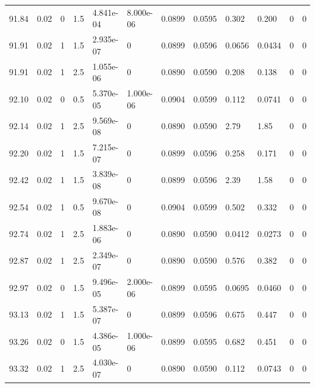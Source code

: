 \documentclass[preview]{standalone}
\begin{document}
{{{{{{{{{{{{{{{{{{\begin{tabular}{L{1.2cm}C{1.2cm} C{0.3cm}C{0.5cm} C{1.4cm}C{1.4cm} C{1.4cm}C{1.4cm} C{1.6cm}C{1.6cm} C{1.6cm}C{1.6cm}}
  91.84  &  0.02  & 0     & 1.5 &  4.841e-04  & 8.000e-06  &  0.0899&   0.0595& 0.302 & 0.200   &  0 & 0  \\ 
  91.91  &  0.02  & 1     & 1.5 &  2.935e-07  & 0  &  0.0899&   0.0596& 0.0656 & 0.0434   &  0 & 0  \\ 
  91.91  &  0.02  & 1     & 2.5 &  1.055e-06  & 0  &  0.0890&   0.0590& 0.208 & 0.138   &  0 & 0  \\ 
  92.10  &  0.02  & 0     & 0.5 &  5.370e-05  & 1.000e-06  &  0.0904&   0.0599& 0.112 & 0.0741   &  0 & 0  \\ 
  92.14  &  0.02  & 1     & 2.5 &  9.569e-08  & 0  &  0.0890&   0.0590& 2.79 & 1.85   &  0 & 0  \\ 
  92.20  &  0.02  & 1     & 1.5 &  7.215e-07  & 0  &  0.0899&   0.0596& 0.258 & 0.171   &  0 & 0  \\ 
  92.42  &  0.02  & 1     & 1.5 &  3.839e-08  & 0  &  0.0899&   0.0596& 2.39 & 1.58   &  0 & 0  \\ 
  92.54  &  0.02  & 1     & 0.5 &  9.670e-08  & 0  &  0.0904&   0.0599& 0.502 & 0.332   &  0 & 0  \\ 
  92.74  &  0.02  & 1     & 2.5 &  1.883e-06  & 0  &  0.0890&   0.0590& 0.0412 & 0.0273   &  0 & 0  \\ 
  92.87  &  0.02  & 1     & 2.5 &  2.349e-07  & 0  &  0.0890&   0.0590& 0.576 & 0.382   &  0 & 0  \\ 
  92.97  &  0.02  & 0     & 1.5 &  9.496e-05  & 2.000e-06  &  0.0899&   0.0595& 0.0695 & 0.0460   &  0 & 0  \\ 
  93.13  &  0.02  & 1     & 1.5 &  5.387e-07  & 0  &  0.0899&   0.0596& 0.675 & 0.447   &  0 & 0  \\ 
  93.26  &  0.02  & 0     & 1.5 &  4.386e-05  & 1.000e-06  &  0.0899&   0.0595& 0.682 & 0.451   &  0 & 0  \\ 
  93.32  &  0.02  & 1     & 2.5 &  4.030e-07  & 0  &  0.0890&   0.0590& 0.112 & 0.0743   &  0 & 0  \\ 
\hline 
\end{tabular} 

}}}}}}}}}}}}}}}}}}
\end{document}
